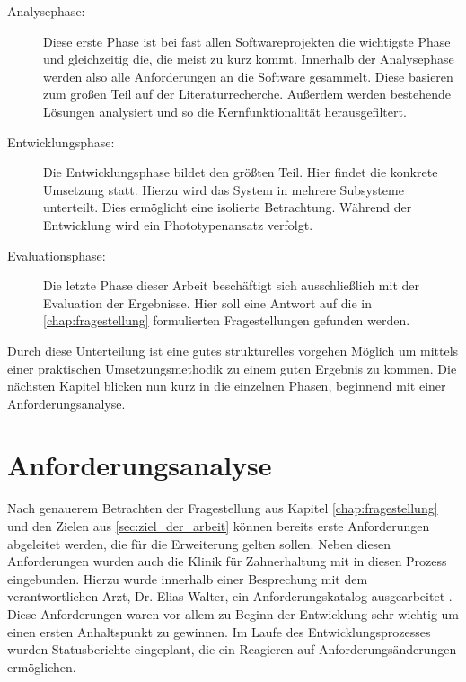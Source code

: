 \begin{description}
	\item[Analysephase:] Diese erste Phase ist bei fast allen Softwareprojekten die
		wichtigste Phase und gleichzeitig die, die meist zu kurz kommt. Innerhalb der
		Analysephase werden also alle Anforderungen an die Software gesammelt. Diese
		basieren zum großen Teil auf der Literaturrecherche. Außerdem werden bestehende
		Lösungen analysiert und so die Kernfunktionalität herausgefiltert.

	\item[Entwicklungsphase:] Die Entwicklungsphase bildet den größten Teil. Hier
		findet die konkrete Umsetzung statt. Hierzu wird das System in mehrere Subsysteme
		unterteilt. Dies ermöglicht eine isolierte Betrachtung. Während der Entwicklung
		wird ein Phototypenansatz verfolgt.

	\item[Evaluationsphase:] Die letzte Phase dieser Arbeit beschäftigt sich ausschließlich
		mit der Evaluation der Ergebnisse. Hier soll eine Antwort auf die in
		\ref{chap:fragestellung} formulierten Fragestellungen gefunden werden.
\end{description}

Durch diese Unterteilung ist eine gutes strukturelles vorgehen Möglich um mittels
einer praktischen Umsetzungsmethodik zu einem guten Ergebnis zu kommen. Die
nächsten Kapitel blicken nun kurz in die einzelnen Phasen, beginnend mit einer Anforderungsanalyse.

\section{Anforderungsanalyse}
\label{sec:anforderungsanalyse} Nach genauerem Betrachten der Fragestellung aus Kapitel
\ref{chap:fragestellung} und den Zielen aus \ref{sec:ziel_der_arbeit} können bereits
erste Anforderungen abgeleitet werden, die für die Erweiterung gelten sollen. Neben
diesen Anforderungen wurden auch die Klinik für Zahnerhaltung mit in diesen Prozess
eingebunden. Hierzu wurde innerhalb einer Besprechung mit dem verantwortlichen
Arzt, Dr. Elias Walter, ein Anforderungskatalog ausgearbeitet \citep[vgl.][]{walter2025}.
Diese Anforderungen waren vor allem zu Beginn der Entwicklung sehr wichtig um einen
ersten Anhaltspunkt zu gewinnen. Im Laufe des Entwicklungsprozesses wurden
Statusberichte eingeplant, die ein Reagieren auf Anforderungsänderungen ermöglichen.

